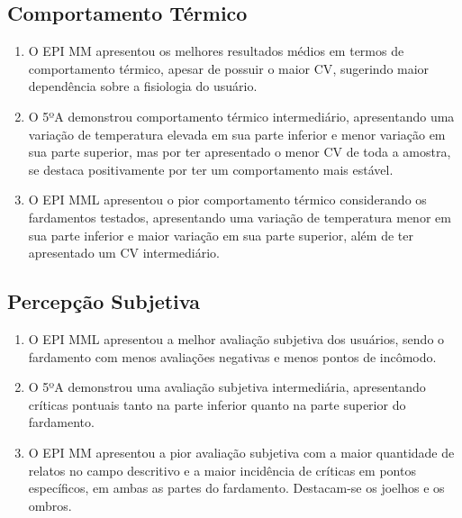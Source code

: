         \subsection{Comportamento Térmico}
            \begin{enumerate}[label=\Roman*.] %
                \item O \acrshort{EPI} \acrlong{MM} apresentou os melhores resultados médios em termos de 
                comportamento térmico, apesar de possuir o maior \acrlong{CV}, sugerindo maior dependência 
                sobre a fisiologia do usuário.
                \item O 5ºA demonstrou comportamento térmico intermediário, apresentando uma variação de 
                temperatura elevada em sua parte inferior e menor variação em sua parte superior, mas por 
                ter apresentado o menor \acrlong{CV} de toda a amostra, se destaca positivamente por ter 
                um comportamento mais estável.
                \item O \acrshort{EPI} \acrlong{MML} apresentou o pior comportamento térmico considerando os 
                fardamentos testados, apresentando uma variação de temperatura menor em 
                sua parte inferior e maior variação em sua parte superior, além de 
                ter apresentado um \acrlong{CV} intermediário.
                \end{enumerate}    

        \subsection{Percepção Subjetiva}
            \begin{enumerate}[label=\Roman*.] %
                \item O \acrshort{EPI} \acrlong{MML} apresentou a melhor avaliação subjetiva dos usuários, 
                sendo o fardamento com menos avaliações negativas e menos pontos de incômodo.
                \item O 5ºA demonstrou uma avaliação subjetiva intermediária, apresentando críticas 
                pontuais tanto na parte inferior quanto na parte superior do fardamento.
                \item O \acrshort{EPI} \acrlong{MM} apresentou a pior avaliação subjetiva 
                com a maior quantidade de relatos no campo descritivo e a maior incidência de críticas em 
                pontos específicos, em ambas as partes do fardamento. Destacam-se os joelhos e os ombros.
                \end{enumerate}

